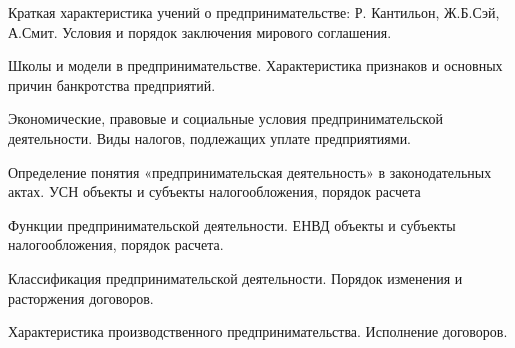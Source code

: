 \documentclass[
	14pt,
	a4paper,
	]
	{scrartcl}
\begin{document}
\shapk
{}
\setcounter{zad}{0}

\vfill
\z Краткая характеристика учений о предпринимательстве: Р. Кантильон, Ж.Б.Сэй, А.Смит.
 \vfill
\z Условия и порядок заключения мирового соглашения. \vfill

\vfill

\newpage


\shapk
{}
\setcounter{zad}{0}

\vfill
\z Школы и модели в предпринимательстве.
 \vfill
\z Характеристика признаков и основных причин банкротства предприятий.
 \vfill

\vfill

\newpage


\shapk
{}
\setcounter{zad}{0}

\vfill
\z Экономические, правовые и социальные условия предпринимательской деятельности.
 \vfill
\z Виды налогов, подлежащих уплате предприятиями.
 \vfill

\vfill

\newpage


\shapk
{}
\setcounter{zad}{0}

\vfill
\z Определение понятия «предпринимательская деятельность» в законодательных актах.
 \vfill
\z УСН объекты и субъекты налогообложения, порядок расчета 
 \vfill

\vfill

\newpage


\shapk
{}
\setcounter{zad}{0}

\vfill
\z Функции предпринимательской деятельности.
 \vfill
\z ЕНВД объекты и субъекты налогообложения, порядок расчета.
 \vfill

\vfill

\newpage


\shapk
{}
\setcounter{zad}{0}

\vfill
\z Классификация предпринимательской деятельности.
 \vfill
\z Порядок изменения и расторжения договоров.
 \vfill

\vfill

\newpage


\shapk
{}
\setcounter{zad}{0}

\vfill
\z Характеристика производственного предпринимательства.
 \vfill
\z Исполнение договоров.
 \vfill

\vfill

\newpage
\end{document}
